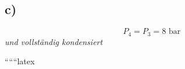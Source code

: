 

\subsection*{c)}
\[ P_4 = P_3 = 8 \text{ bar} \]
\textit{und vollständig kondensiert}

``````latex